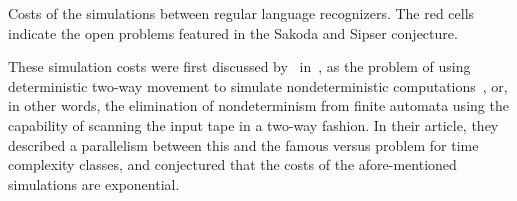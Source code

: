 \begin{table}
	\centering
	\caption[Costs of the simulations between regular language recognizers.]{Costs of the simulations between regular language recognizers.
		The red cells indicate the open problems featured in the Sakoda and Sipser conjecture.}
	\label{tab:sims-core-general-context}
\end{table}

These simulation costs were first discussed by~\citeauthor{SakSip78} in~\citeyear{SakSip78}, as the problem of using deterministic two-way movement to simulate nondeterministic computations~\cite{SakSip78}, or, in other words, the elimination of nondeterminism from finite automata using the capability of scanning the input tape in a two-way fashion.
In their article, they described a parallelism between this and the famous \cP versus \cNP problem for time complexity classes, and conjectured that the costs of the afore-mentioned simulations are exponential.

